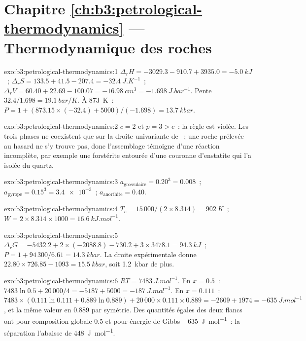 \section*{Chapitre \ref{ch:b3:petrological-thermodynamics} --- Thermodynamique des roches}

\begin{solution}{exo:b3:petrological-thermodynamics:1}
$\Delta_rH = -3029.3 - 910.7 + 3935.0 = \qty{-5.0}{kJ}$~; $\Delta_rS = 133.5 +
41.5 - 207.4 = \qty{-32.4}{J.K^{-1}}$~; $\Delta_rV = 60.40 + 22.69 - 100.07 =
\qty{-16.98}{cm^3} = \qty{-1.698}{J.bar^{-1}}$. Pente $32.4/1.698 =
\qty{19.1}{bar/K}$. À \qty{873}{K}~: $P = 1 + (873.15\times(-32.4) +
5000)/(-1.698) = \qty{13.7}{kbar}$.
\end{solution}

\begin{solution}{exo:b3:petrological-thermodynamics:2}
$c = 2$ et $p = 3 > c$~: la règle est violée. Les trois phases ne coexistent
que sur la droite univariante de ~; une roche
prélevée au hasard ne s'y trouve pas, donc l'assemblage témoigne d'une réaction
incomplète, par exemple une forstérite entourée d'une couronne d'enstatite qui
l'a isolée du quartz.
\end{solution}

\begin{solution}{exo:b3:petrological-thermodynamics:3}
$a_{\text{grossulaire}} = 0.20^3 = 0.008$~; $a_{\text{pyrope}} = 0.15^3 =
\num{3.4e-3}$~; $a_{\text{anorthite}} = 0.40$.
\end{solution}

\begin{solution}{exo:b3:petrological-thermodynamics:4}
$T_c = 15\,000/(2\times8.314) = \qty{902}{K}$~; $W = 2\times8.314\times1000
= \qty{16.6}{kJ.mol^{-1}}$.
\end{solution}

\begin{solution}{exo:b3:petrological-thermodynamics:5}
$\Delta_rG = -5432.2 + 2\times(-2088.8) - 730.2 + 3\times3478.1 =
\qty{94.3}{kJ}$~; $P = 1 + 94\,300/6.61 = \qty{14.3}{kbar}$. La droite
expérimentale donne $22.80\times726.85 - 1093 = \qty{15.5}{kbar}$, soit
\qty{1.2}{kbar} de plus.
\end{solution}

\begin{solution}{exo:b3:petrological-thermodynamics:6}
$RT = \qty{7483}{J.mol^{-1}}$. En $x = 0.5$~: $7483\ln0.5 + 20\,000/4 = -5187 +
5000 = \qty{-187}{J.mol^{-1}}$. En $x = 0.111$~: $7483\times(0.111\ln0.111 +
0.889\ln0.889) + 20\,000\times0.111\times0.889 = -2609 + 1974 =
\qty{-635}{J.mol^{-1}}$, et la même valeur en 0.889 par symétrie. Des quantités
égales des deux flancs ont pour composition globale 0.5 et pour énergie de Gibbs
\qty{-635}{J.mol^{-1}}~: la séparation l'abaisse de \qty{448}{J.mol^{-1}}.
\end{solution}

